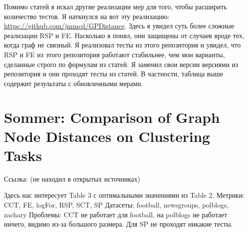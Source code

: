 \documentclass{article}
\begin{document}
Помимо статей я искал другие реализации мер для того, чтобы расширить количество тестов. Я наткнулся на вот эту реализацию: \url{https://github.com/jmmcd/GPDistance}. Здесь я увидел суть более сложные реализации RSP и FE. Насколько я понял, они защищены от случаев вроде тех, когда граф не связный. Я реализовал тесты из этого репозитория и увидел, что RSP и FE из этого репозитория работают стабильнее, чем мои варианты, сделанные строго по формулам из статей. Я заменил свои версии версиями из репозитория и они проходят тесты из статей. В частности, таблица выше содержит результаты с обновленными мерами.

\section{Sommer: Comparison of Graph Node Distances on Clustering Tasks}
Ссылка: (не находил в открытых источниках)

Здесь нас интересует Table 3 с оптимальными значениями из Table 2.
Метрики: CCT, FE, logFor, RSP, SCT, SP
Датасеты: football, newsgroups, polblogs, zachary
Проблемы: CCT не работает для football, на polblogs не работает ничего, видимо из-за большого размера. Для SP не проходят никакие тесты.
\end{document}
